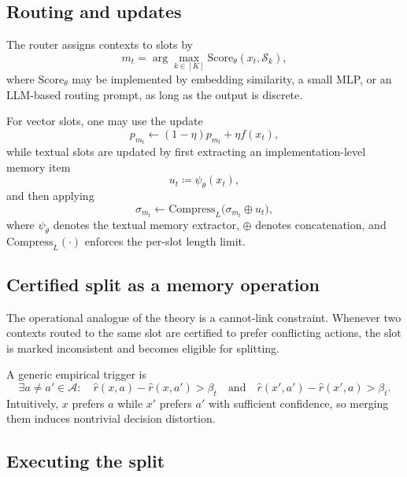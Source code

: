 \documentclass{article}
\theoremstyle{plain}
\theoremstyle{definition}
\theoremstyle{remark}
\newcommand{\cA}{\mathcal{A}}
\newcommand{\Score}{\mathrm{Score}}
\newcommand{\Compress}{\mathrm{Compress}}
\begin{document}
\subsection{Routing and updates}
The router assigns contexts to slots by
\begin{equation}
\label{eq:router-score}
m_t = \arg\max_{k\in[K]} \Score_\theta(x_t,\mathcal S_k),
\end{equation}
where $\Score_\theta$ may be implemented by embedding similarity, a small MLP, or an LLM-based routing prompt, as long as the output is discrete.

For vector slots, one may use the update
\begin{equation}
\label{eq:proto-update}
p_{m_t}\leftarrow (1-\eta)p_{m_t}+\eta f(x_t),
\end{equation}
while textual slots are updated by first extracting an implementation-level
memory item
\[
u_t \coloneqq \psi_\theta(x_t),
\]
and then applying
\begin{equation}
\label{eq:summary-update}
\sigma_{m_t}\leftarrow \Compress_L\!\big(\sigma_{m_t}\oplus u_t\big),
\end{equation}
where \(\psi_\theta\) denotes the textual memory extractor, \(\oplus\)
denotes concatenation, and \(\Compress_L(\cdot)\) enforces the per-slot
length limit.

\subsection{Certified split as a memory operation}
The operational analogue of the theory is a cannot-link constraint.
Whenever two contexts routed to the same slot are certified to prefer conflicting actions, the slot is marked inconsistent and becomes eligible for splitting.

A generic empirical trigger is
\begin{equation}
\label{eq:cannotlink-test}
\exists a\neq a' \in \cA:
\quad
\widehat r(x,a)-\widehat r(x,a')>\beta_t
\quad\text{and}\quad
\widehat r(x',a')-\widehat r(x',a)>\beta_t.
\end{equation}
Intuitively, $x$ prefers $a$ while $x'$ prefers $a'$ with sufficient confidence, so merging them induces nontrivial decision distortion.

\subsection{Executing the split}
\label{app:executing-split}
\end{document}
